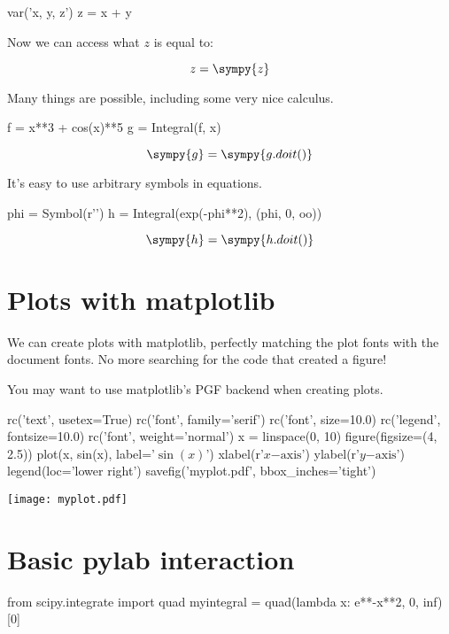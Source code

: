 \documentclass[11pt]{article}
\begin{document}
\begin{sympyblock}
var('x, y, z')
z = x + y
\end{sympyblock}

Now we can access what $z$ is equal to:

\[z=\sympy{z}\]

Many things are possible, including some very nice calculus.

\begin{sympyblock}
f = x**3 + cos(x)**5
g = Integral(f, x)
\end{sympyblock}

\[\sympy{g}=\sympy{g.doit()}\]

It's easy to use arbitrary symbols in equations.

\begin{sympyblock}
phi = Symbol(r'\phi')
h = Integral(exp(-phi**2), (phi, 0, oo))
\end{sympyblock}

\[\sympy{h}=\sympy{h.doit()}\]



\section{Plots with matplotlib}

We can create plots with matplotlib, perfectly matching the plot fonts with the document fonts.  No more searching for the code that created a figure!

You may want to use matplotlib's PGF backend when creating plots.

\begin{pylabblock}
rc('text', usetex=True)
rc('font', family='serif')
rc('font', size=10.0)
rc('legend', fontsize=10.0)
rc('font', weight='normal')
x = linspace(0, 10)
figure(figsize=(4, 2.5))
plot(x, sin(x), label='$\sin(x)$')
xlabel(r'$x\mathrm{-axis}$')
ylabel(r'$y\mathrm{-axis}$')
legend(loc='lower right')
savefig('myplot.pdf', bbox_inches='tight')
\end{pylabblock}

\begin{center}
\texttt{[image: myplot.pdf]}
\end{center}


\section{Basic pylab interaction}

\begin{pylabblock}
from scipy.integrate import quad
myintegral = quad(lambda x: e**-x**2, 0, inf)[0]
\end{pylabblock}
\end{document}

